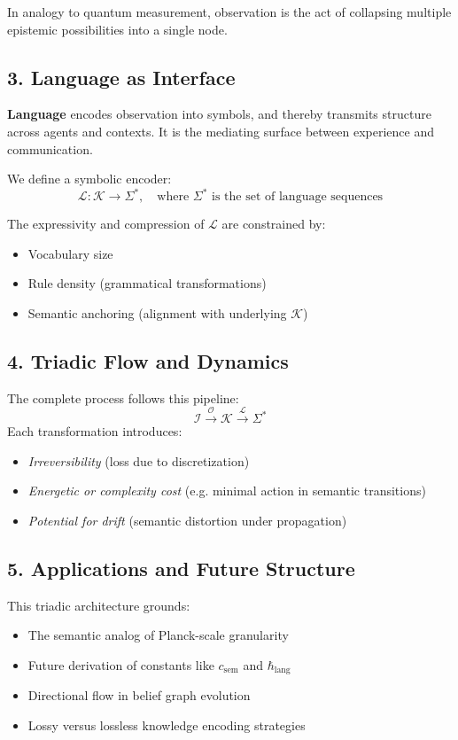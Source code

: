 In analogy to quantum measurement, observation is the act of collapsing multiple epistemic possibilities into a single node.

\subsection*{3. Language as Interface}

\textbf{Language} encodes observation into symbols, and thereby transmits structure across agents and contexts. It is the mediating surface between experience and communication.

We define a symbolic encoder:
\[
\mathcal{L} : \mathcal{K} \to \Sigma^*, \quad \text{where } \Sigma^* \text{ is the set of language sequences}
\]

The expressivity and compression of $\mathcal{L}$ are constrained by:
\begin{itemize}
  \item Vocabulary size
  \item Rule density (grammatical transformations)
  \item Semantic anchoring (alignment with underlying $\mathcal{K}$)
\end{itemize}

\subsection*{4. Triadic Flow and Dynamics}

The complete process follows this pipeline:
\[
\mathcal{I} \xrightarrow{\mathcal{O}} \mathcal{K} \xrightarrow{\mathcal{L}} \Sigma^*
\]
Each transformation introduces:
\begin{itemize}
  \item \emph{Irreversibility} (loss due to discretization)
  \item \emph{Energetic or complexity cost} (e.g. minimal action in semantic transitions)
  \item \emph{Potential for drift} (semantic distortion under propagation)
\end{itemize}

\subsection*{5. Applications and Future Structure}

This triadic architecture grounds:
\begin{itemize}
  \item The semantic analog of Planck-scale granularity
  \item Future derivation of constants like $c_\text{sem}$ and $\hbar_\text{lang}$
  \item Directional flow in belief graph evolution
  \item Lossy versus lossless knowledge encoding strategies
\end{itemize}

